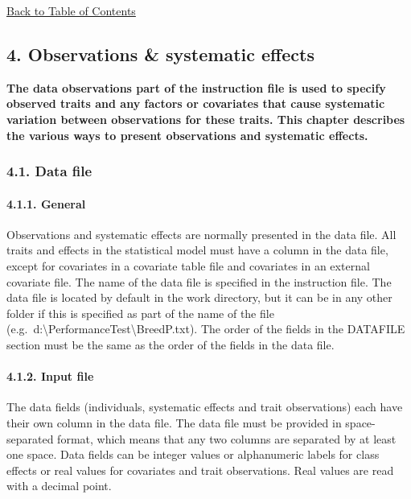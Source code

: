 \hyperref[Tabl01]{Back to Table of Contents}

\newpage

\subsection{4. Observations \& systematic effects}\label{Obse01}

\textbf{The data observations part of the instruction file is used to
specify observed traits and any factors or covariates that cause
systematic variation between observations for these traits. This chapter
describes the various ways to present observations and systematic
effects.}

\subsubsection{4.1. Data file}\label{Obse02}

\paragraph{4.1.1. General}\label{Obse03}

Observations and systematic effects are normally presented in the data
file. All traits and effects in the statistical model must have a column
in the data file, except for covariates in a covariate table file and
covariates in an external covariate file. The name of the data file is
specified in the instruction file. The data file is located by default
in the work directory, but it can be in any other folder if this is
specified as part of the name of the file
(e.g.~d:\textbackslash PerformanceTest\textbackslash BreedP.txt). The
order of the fields in the DATAFILE section must be the same as the
order of the fields in the data file.

\paragraph{4.1.2. Input file}\label{Obse04}

The data fields (individuals, systematic effects and trait observations)
each have their own column in the data file. The data file must be
provided in space-separated format, which means that any two columns are
separated by at least one space. Data fields can be integer values or
alphanumeric labels for class effects or real values for covariates and
trait observations. Real values are read with a decimal point.

